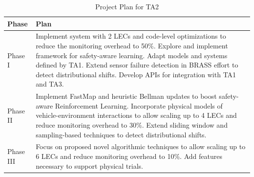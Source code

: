 \begin{table}[ht]
\caption{Project Plan for TA2}
  \centering
  {\footnotesize
\begin{tabular}{|m{.6in}|m{5.55in}|} 
\hline
\textbf{Phase} & \textbf{Plan} 
\\\hline
Phase I & 
Implement system with 2 LECs and code-level optimizations to reduce the monitoring overhead to 50\%. Explore and implement framework for safety-aware learning. Adapt models and systems defined by TA1. Extend sensor failure detection in BRASS effort to detect distributional shifts. Develop APIs for integration with TA1 and TA3. \\
\hline
Phase II & 
Implement FastMap and heuristic Bellman updates to boost safety-aware Reinforcement Learning. Incorporate physical models of vehicle-environment interactions to allow scaling up to 4 LECs and reduce monitoring overhead to 30\%. Extend sliding window and sampling-based techniques to detect distributional shifts.  \\
\hline
Phase III & 
Focus on proposed novel algorithmic techniques to allow scaling up to 6 LECs and reduce monitoring overhead to 10\%. Add features necessary to support physical trials. \\\cline{1-2}
\hline
\end{tabular}
}
\end{table}


